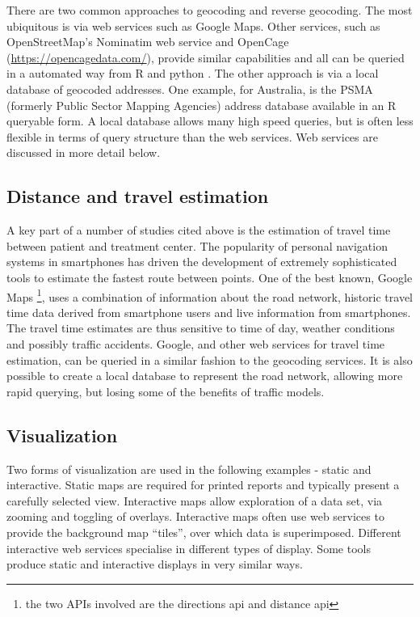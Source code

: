 \documentclass[utf8]{frontiersHLTH}
\begin{document}
There are two common approaches to geocoding and reverse geocoding. The
most ubiquitous is via web services such as Google Maps. Other services,
such as OpenStreetMap's Nominatim web service and OpenCage
(\url{https://opencagedata.com/}), provide similar capabilities and all
can be queried in a automated way from R and python \cite{opencage}. The
other approach is via a local database of geocoded addresses. One
example, for Australia, is the PSMA (formerly Public Sector Mapping
Agencies) address database available in an R queryable form. A local
database allows many high speed queries, but is often less flexible in
terms of query structure than the web services. Web services are
discussed in more detail below.

\subsection{Distance and travel
estimation}\label{distance-and-travel-estimation}

A key part of a number of studies cited above is the estimation of
travel time between patient and treatment center. The popularity of
personal navigation systems in smartphones has driven the development of
extremely sophisticated tools to estimate the fastest route between
points. One of the best known, Google Maps \footnote{the two APIs
involved are the directions api and distance api}, uses a combination
of information about the road network, historic travel time data derived
from smartphone users and live information from smartphones. The travel
time estimates are thus sensitive to time of day, weather conditions and
possibly traffic accidents. Google, and other web services for travel
time estimation, can be queried in a similar fashion to the geocoding
services. It is also possible to create a local database to represent
the road network, allowing more rapid querying, but losing some of the
benefits of traffic models.

\subsection{Visualization}\label{visualization}

Two forms of visualization are used in the following examples - static
and interactive. Static maps are required for printed reports and
typically present a carefully selected view. Interactive maps allow
exploration of a data set, via zooming and toggling of overlays.
Interactive maps often use web services to provide the background map
``tiles'', over which data is superimposed. Different interactive web
services specialise in different types of display. Some tools produce
static and interactive displays in very similar ways.
\end{document}
